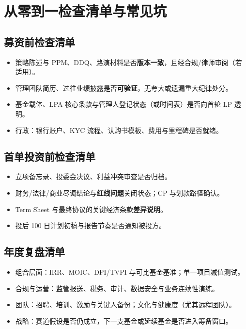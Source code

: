 \chapter{从零到一检查清单与常见坑}

\section{募资前检查清单}

\begin{itemize}
  \item 策略陈述与 PPM、DDQ、路演材料是否\textbf{版本一致}，且经合规/律师审阅（若适用）。
  \item 管理团队简历、过往业绩披露是否\textbf{可验证}，无夸大或遗漏重大纪律处分。
  \item 基金载体、LPA 核心条款与管理人登记状态（或时间表）是否向首轮 LP 透明。
  \item 行政：银行账户、KYC 流程、认购书模板、费用与里程碑是否就绪。
\end{itemize}

\section{首单投资前检查清单}

\begin{itemize}
  \item 立项备忘录、投委会决议、利益冲突审查是否归档。
  \item 财务/法律/商业尽调结论与\textbf{红线问题}关闭状态；CP 与划款路径确认。
  \item Term Sheet 与最终协议的关键经济条款\textbf{差异说明}。
  \item 投后 100 日计划初稿与报告节奏是否通知被投方。
\end{itemize}

\section{年度复盘清单}

\begin{itemize}
  \item 组合层面：IRR、MOIC、DPI/TVPI 与可比基金基准；单一项目减值测试。
  \item 合规与运营：监管报送、税务、审计、数据安全与业务连续性演练。
  \item 团队：招聘、培训、激励与关键人备份；文化与健康度（尤其远程团队）。
  \item 战略：赛道假设是否仍成立，下一支基金或延续基金是否进入筹备窗口。
\end{itemize}

